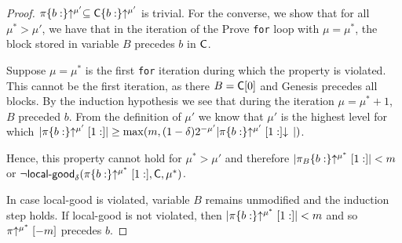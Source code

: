 \begin{proof}
    $\pi\{b:\}\negthickspace\uparrow^{\mu'} \subseteq \mathsf{C}\{b:\}\negthickspace\uparrow^{\mu'}$ is trivial.
    For the converse, we show that for all $\mu^* > \mu'$, we have that in
    the iteration of the Prove \texttt{for} loop with $\mu = \mu^*$, the block
    stored in variable $B$ precedes $b$ in $\mathsf{C}$.

    Suppose $\mu = \mu^*$ is the first \texttt{for} iteration during which the
    property is violated. This cannot be the first iteration, as there
    $B = \mathsf{C}[0]$ and Genesis precedes all blocks. By the
    induction hypothesis we see that during the iteration $\mu = \mu^* + 1$,
    $B$ preceded $b$. From the definition of $\mu'$ we know
    that $\mu'$ is the highest level for which
    $|\pi\{b:\}\negthickspace\uparrow^{\mu'}[1:]|
    \geq \max(m, (1 -
    \delta)2^{-\mu'}|\pi\{b:\}\negthickspace\uparrow^{\mu'}[1:]\negthickspace\downarrow\,|)$.

    Hence, this
    property cannot hold for $\mu^* > \mu'$ and therefore
    $|\pi_B\{b:\}\negthickspace\uparrow^{\mu^*}[1:]| < m$ or $\lnot
    \textsf{local-good}_\delta(\pi\{b:\}\negthickspace\uparrow^{\mu^*}[1:], \mathsf{C}, \mu^*)$.

    In case \textsf{local-good} is violated, variable $B$ remains unmodified and
    the induction step holds. If \textsf{local-good} is not violated, then
    $|\pi\{b:\}\negthickspace\uparrow^{\mu^*}[1:]| < m$ and so $\pi\negthickspace\uparrow^{\mu^*}[-m]$
    precedes $b$.
\end{proof}

